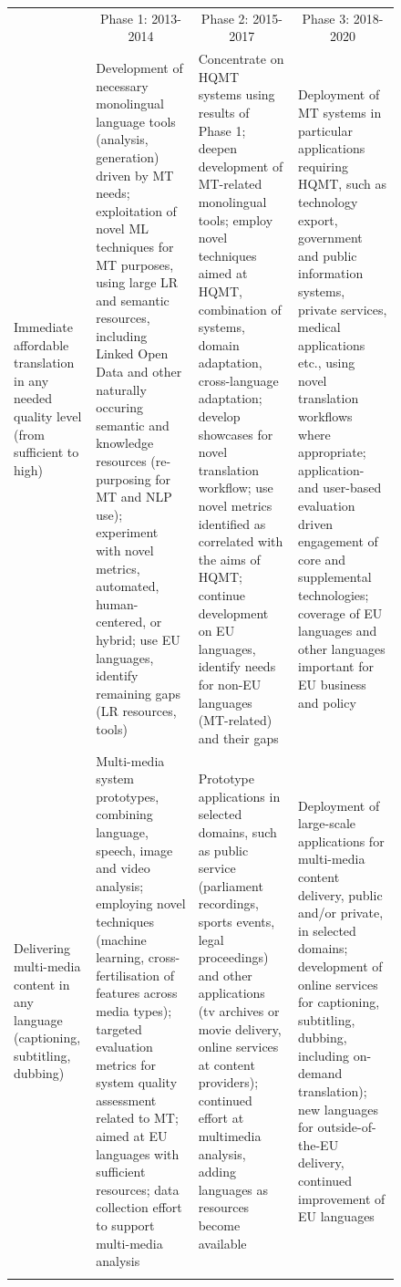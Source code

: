 \documentclass[10pt, plain]{../../metanetpaper}
\begin{document}
\begin{multicols}{2}
\begin{figure}[htbp]
  \centering
  \small
  \begin{tabular}{@{}p{2.5cm}p{4cm}p{4cm}p{4cm}@{}} \toprule\addlinespace
    \multicolumn{1}{c}{Research Priority} & \multicolumn{1}{c}{Phase 1: 2013-2014} & \multicolumn{1}{c}{Phase 2: 2015-2017} & \multicolumn{1}{c}{Phase 3: 2018-2020} \\ \addlinespace\midrule\addlinespace
    Immediate affordable translation in any needed quality level (from sufficient to high) & Development of necessary monolingual language tools (analysis, generation) driven by MT needs; exploitation of novel ML techniques for MT purposes, using large LR and semantic resources, including Linked Open Data and other naturally occuring semantic and knowledge  resources (re-purposing for MT and NLP use); experiment with novel metrics, automated, human-centered, or hybrid; use EU languages, identify remaining gaps (LR resources, tools) & Concentrate on HQMT systems using results of Phase 1; deepen development of MT-related monolingual tools; employ novel techniques aimed at HQMT, combination of systems, domain adaptation, cross-language adaptation; develop showcases for novel translation workflow; use novel metrics identified as correlated with the aims of HQMT; continue development on EU languages, identify needs for non-EU languages (MT-related) and their gaps & Deployment of MT systems in particular applications requiring HQMT, such as technology export, government and public information systems, private services, medical applications etc., using novel translation workflows where appropriate; application- and user-based evaluation driven engagement of core and supplemental technologies; coverage of EU languages and other languages important for EU business and policy \\ \addlinespace
    Delivering multi-media content in any language (captioning, subtitling, dubbing) & Multi-media system prototypes, combining language, speech, image and video analysis; employing novel techniques (machine learning, cross-fertilisation of features across media types); targeted evaluation metrics for system quality assessment related to MT; aimed at EU languages with sufficient resources; data collection effort to support multi-media analysis & Prototype applications in selected domains, such as public service (parliament recordings, sports events, legal proceedings) and other applications (tv archives or movie delivery, online services at content providers); continued effort at multimedia analysis, adding languages as resources become available & Deployment of large-scale applications for multi-media content delivery, public and/or private, in selected domains; development of online services for captioning, subtitling, dubbing, including on-demand translation); new languages for outside-of-the-EU delivery, continued improvement of EU languages \\ \addlinespace

\end{tabular}
\end{figure}
\end{multicols}
\end{document}
